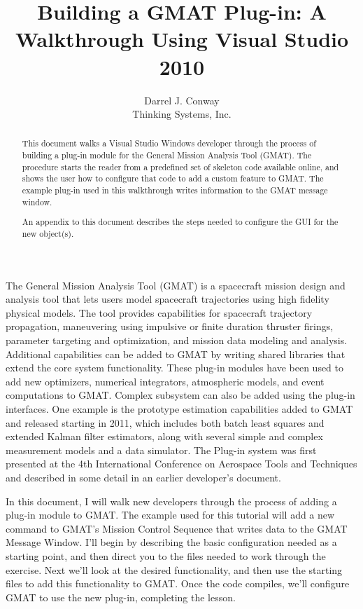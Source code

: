 \documentclass[10pt,letterpaper]{article}
\author{Darrel J. Conway\\Thinking Systems, Inc.}
\title{Building a GMAT Plug-in: A Walkthrough Using Visual Studio 2010}
\begin{document}
\maketitle
\begin{abstract}
This document walks a Visual Studio Windows developer through the process of building a plug-in module for the General Mission Analysis Tool (GMAT).  The procedure starts the reader from a predefined set of skeleton code available online, and shows the user how to configure that code to add a custom feature to GMAT.  The example plug-in used in this walkthrough writes information to the GMAT message window.

An appendix to this document describes the steps needed to configure the GUI for the new object(s).  
\end{abstract}

The General Mission Analysis Tool (GMAT) is a spacecraft mission design and analysis tool that lets users model spacecraft trajectories using high fidelity physical models.  The tool provides capabilities for spacecraft trajectory propagation, maneuvering using impulsive or finite duration thruster firings, parameter targeting and optimization, and mission data modeling and analysis.  Additional capabilities can be added to GMAT by writing shared libraries that extend the core system functionality.  These plug-in modules have been used to add new optimizers, numerical integrators, atmospheric models, and event computations to GMAT.  Complex subsystem can also be added using the plug-in interfaces.  One example is the prototype estimation capabilities added to GMAT and released starting in 2011, which includes both batch least squares and extended Kalman filter estimators, along with several simple and complex measurement models and a data simulator.  The Plug-in system was first presented at the 4th International Conference on Aerospace Tools and Techniques\cite{Madrid} and described in some detail in an earlier developer's document\cite{PluginDoc}.

In this document, I will walk new developers through the process of adding a plug-in module to GMAT.  The example used for this tutorial will add a new command to GMAT's Mission Control Sequence that writes data to the GMAT Message Window.  I'll begin by describing the basic configuration needed as a starting point, and then direct you to the files needed to work through the exercise.  Next we'll look at the desired functionality, and then use the starting files to add this functionality to GMAT.  Once the code compiles, we'll configure GMAT to use the new plug-in, completing the lesson.
\end{document}
